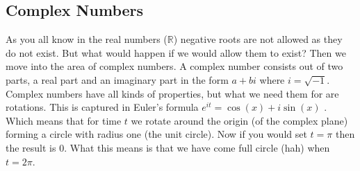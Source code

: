 \subsection{Complex Numbers} \label{sec:complex}
As you all know in the real numbers ($\mathbb{R}$) negative roots are not allowed as they do not exist. But what would happen if we would allow them to exist? Then we move into the area of 
complex numbers. A complex number consists out of two parts, a real part and an imaginary part in the form $a + bi$ where $i = \sqrt{-1}$. Complex numbers have all kinds of properties, but what 
we need them for are rotations. This is captured in Euler's formula $e^{it} = \cos(x) + i\sin(x)$ \cite{eulerFormula}. Which means that for time $t$ we rotate around the origin (of the complex 
plane) forming a circle with radius one (the unit circle). Now if you would set $t = \pi$ then the result is $0$. What this means is that we have come full circle (hah) when $t = 2\pi$.